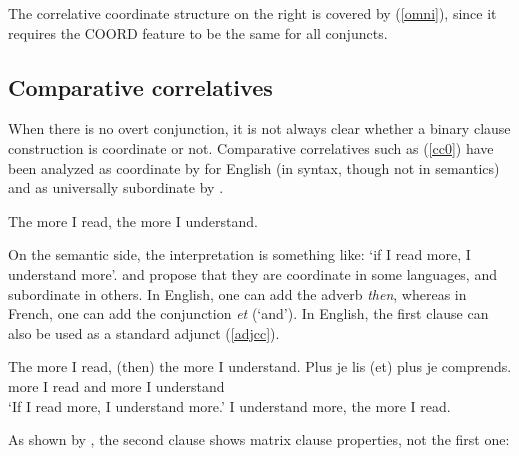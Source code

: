 \documentclass[output=paper
                ,modfonts
                ,nonflat
	        ,collection
	        ,collectionchapter
	        ,collectiontoclongg
 	        ,biblatex
                ,babelshorthands
                ,newtxmath
                ,draftmode
                ,colorlinks, citecolor=brown
]{./langsci/langscibook}
\begin{document}
{The correlative coordinate structure on the right is covered by (\ref{omni}), since it requires the COORD feature to be the same for all conjuncts. 



\subsection{Comparative correlatives}



When there is no overt conjunction, it is not always clear whether a binary clause construction is coordinate or not. Comparative correlatives such as (\ref{cc0}) have been analyzed as coordinate by \citet{culijack} for English (in syntax, though not in semantics) and as universally subordinate  by \citet{dikken}. 

\begin{exe}
\ex The more I read, the more I understand. \label{cc0}
\end{exe}

On the semantic side, the interpretation is something like: `if I read more, I understand
more'. \citet{Abeille:06} and \citet{Abeille:Borsley:08} propose that they are  coordinate in some languages, 
 and subordinate in others. In English, one can add the adverb \emph{then}, whereas in French, one can add the conjunction \emph{et} (`and'). In English, the first clause can also be used as a standard adjunct (\ref{adjcc}).
 
 \begin{exe}
 \ex
\begin{xlista}
\ex The more I read, (then) the more I understand.
\ex 
\gll Plus je lis (et) plus je comprends.\\
     more I read and more I understand\\
\glt `If I read more, I understand more.'
\ex I understand more, the more I read.
\end{xlista}\label{adjcc}
\end{exe}

As shown by \citet[549--550]{culijack}, the second clause shows matrix clause properties, not the first one:

\begin{exe}
 \ex
\begin{xlista}
\end{xlista}
\end{exe}

}
\end{document}
